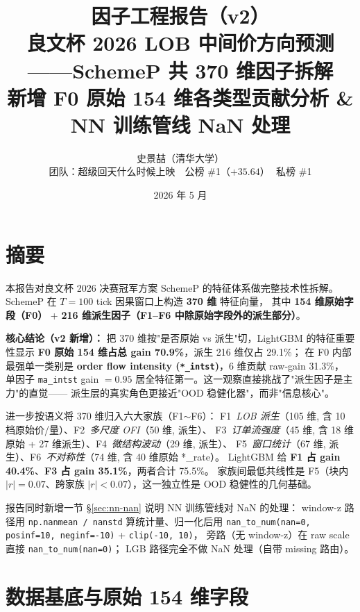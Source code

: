 \documentclass[10.5pt,a4paper]{article}
\title{\color{icmlblue}\textbf{因子工程报告（v2）}\\
\large 良文杯 2026 LOB 中间价方向预测——SchemeP 共 370 维因子拆解\\
\normalsize 新增 F0 原始 154 维各类型贡献分析 \& NN 训练管线 NaN 处理}
\author{史景喆（清华大学）\\
\small 团队：超级回天什么时候上映 \,\textbar\, 公榜 \#1（$+35.64$）\,\textbar\, 私榜 \#1}
\date{2026 年 5 月}
\begin{document}
\maketitle

\section{摘要}

本报告对良文杯 2026 决赛冠军方案 SchemeP 的特征体系做完整技术性拆解。
SchemeP 在 $T=100$ tick 因果窗口上构造 \textbf{370 维} 特征向量，
其中 \textbf{154 维原始字段（F0）} + \textbf{216 维派生因子（F1–F6 中除原始字段外的派生部分）}。

\textbf{核心结论（v2 新增）：} 把 370 维按"是否原始 vs 派生"切，LightGBM 的特征重要性显示
\textbf{F0 原始 154 维占总 gain 70.9\%}，派生 216 维仅占 29.1\%；
在 F0 内部最强单一类别是 \textbf{order flow intensity (\texttt{*\_intst})}，6 维贡献 raw-gain 31.3\%，
单因子 \texttt{ma\_intst} gain $= 0.95$ 居全特征第一。这一观察直接挑战了"派生因子是主力"的直觉——
派生层的真实角色更接近"OOD 稳健化器"，而非"信息核心"。

进一步按语义将 370 维归入六大家族（F1$\sim$F6）：
F1~\emph{LOB 派生}（105 维, 含 10 档原始价/量）、F2~\emph{多尺度 OFI}（50 维, 派生）、
F3~\emph{订单流强度}（45 维, 含 18 维原始 + 27 维派生）、F4~\emph{微结构波动}（29 维, 派生）、
F5~\emph{窗口统计}（67 维, 派生）、F6~\emph{不对称性}（74 维, 含 40 维原始 *\_rate）。
LightGBM 给 \textbf{F1 占 gain 40.4\%}、\textbf{F3 占 gain 35.1\%}，两者合计 75.5\%。
家族间最低共线性是 F5（块内 $|r|=0.07$、跨家族 $|r|<0.07$），这一独立性是 OOD 稳健性的几何基础。

报告同时新增一节 §\ref{sec:nn-nan} 说明 NN 训练管线对 NaN 的处理：
window-z 路径用 \texttt{np.nanmean / nanstd} 算统计量、归一化后用
\texttt{nan\_to\_num(nan=0, posinf=10, neginf=-10)} + \texttt{clip(-10, 10)}，
旁路（无 window-z）在 raw scale 直接 \texttt{nan\_to\_num(nan=0)}；
LGB 路径完全不做 NaN 处理（自带 missing 路由）。

\section{数据基底与原始 154 维字段}
\end{document}
